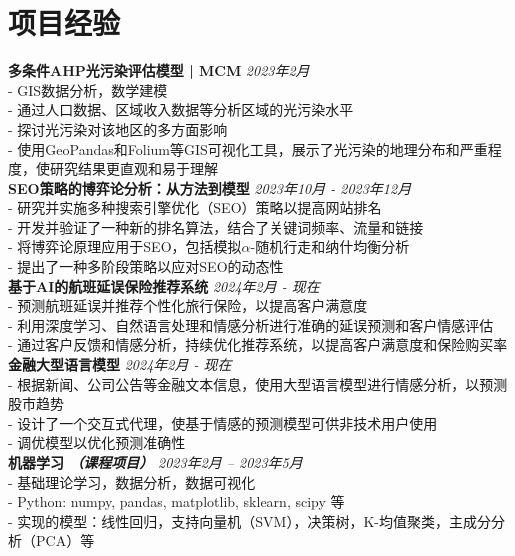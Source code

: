 \documentclass[a4paper,10pt]{article}
\begin{document}
\section*{项目经验}
\textbf{多条件AHP光污染评估模型 | MCM} \hfill \textit{2023年2月}\\
- GIS数据分析，数学建模\\
- 通过人口数据、区域收入数据等分析区域的光污染水平\\
- 探讨光污染对该地区的多方面影响\\
- 使用GeoPandas和Folium等GIS可视化工具，展示了光污染的地理分布和严重程度，使研究结果更直观和易于理解\\
\textbf{SEO策略的博弈论分析：从方法到模型} \hfill \textit{2023年10月 - 2023年12月}\\
- 研究并实施多种搜索引擎优化（SEO）策略以提高网站排名\\
- 开发并验证了一种新的排名算法，结合了关键词频率、流量和链接\\
- 将博弈论原理应用于SEO，包括模拟$\alpha$-随机行走和纳什均衡分析\\
- 提出了一种多阶段策略以应对SEO的动态性\\
\textbf{基于AI的航班延误保险推荐系统} \hfill \textit{2024年2月 - 现在}\\
- 预测航班延误并推荐个性化旅行保险，以提高客户满意度\\
- 利用深度学习、自然语言处理和情感分析进行准确的延误预测和客户情感评估\\
- 通过客户反馈和情感分析，持续优化推荐系统，以提高客户满意度和保险购买率\\
\textbf{金融大型语言模型} \hfill \textit{2024年2月 - 现在}\\
- 根据新闻、公司公告等金融文本信息，使用大型语言模型进行情感分析，以预测股市趋势\\
- 设计了一个交互式代理，使基于情感的预测模型可供非技术用户使用\\
- 调优模型以优化预测准确性\\
\textbf{机器学习 \textit{（课程项目）}} \hfill \textit{2023年2月 -- 2023年5月}\\
- 基础理论学习，数据分析，数据可视化\\
- Python: numpy, pandas, matplotlib, sklearn, scipy 等\\
- 实现的模型：线性回归，支持向量机（SVM），决策树，K-均值聚类，主成分分析（PCA）等\\
\end{document}
